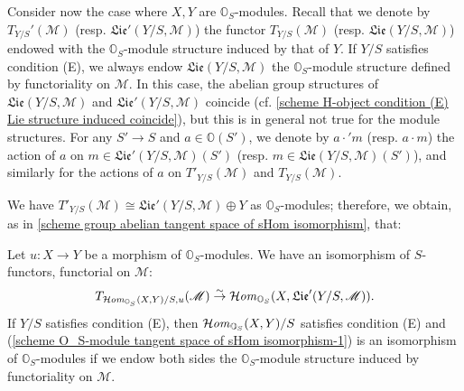 Consider now the case where $X,Y$ are $\mathbb{O}_S$-modules. Recall that we denote by $T_{Y/S}'(\mathscr{M})$ (resp. $\mathfrak{Lie}'(Y/S,\mathscr{M})$) the functor $T_{Y/S}(\mathscr{M})$ (resp. $\mathfrak{Lie}(Y/S,\mathscr{M})$) endowed with the $\mathbb{O}_S$-module structure induced by that of $Y$. If $Y/S$ satisfies condition (E), we always endow $\mathfrak{Lie}(Y/S,\mathscr{M})$ the $\mathbb{O}_S$-module structure defined by functoriality on $\mathscr{M}$. In this case, the abelian group structures of $\mathfrak{Lie}(Y/S,\mathscr{M})$ and $\mathfrak{Lie}'(Y/S,\mathscr{M})$ coincide (cf. \cref{scheme H-object condition (E) Lie structure induced coincide}), but this is in general not true for the module structures. For any $S'\to S$ and $a\in\mathbb{O}(S')$, we denote by $a\cdot'm$ (resp. $a\cdot m$) the action of $a$ on $m\in\mathfrak{Lie}'(Y/S,\mathscr{M})(S')$ (resp. $m\in\mathfrak{Lie}(Y/S,\mathscr{M})(S')$), and similarly for the actions of $a$ on $T'_{Y/S}(\mathscr{M})$ and $T_{Y/S}(\mathscr{M})$.\par
We have $T'_{Y/S}(\mathscr{M})\cong\mathfrak{Lie}'(Y/S,\mathscr{M})\oplus Y$ as $\mathbb{O}_S$-modules; therefore, we obtain, as in \cref{scheme group abelian tangent space of sHom isomorphism}, that:

\begin{proposition}\label{scheme O_S-module tangent space of sHom isomorphism}
Let $u:X\to Y$ be a morphism of $\mathbb{O}_S$-modules. We have an isomorphism of $S$-functors, functorial on $\mathscr{M}$:
\begin{equation}\label{scheme O_S-module tangent space of sHom isomorphism-1}
T_{\operatorname{\mathcal{H}\hspace*{-0.4pt}\textit{om}\hspace{0.5pt}}_{\mathbb{O}_S}(X,Y)/S,u}(\mathscr{M})\stackrel{\sim}{\to} \operatorname{\mathcal{H}\hspace*{-0.4pt}\textit{om}\hspace{0.5pt}}_{\mathbb{O}_S}(X,\mathfrak{Lie}'(Y/S,\mathscr{M})).
\end{equation}
If $Y/S$ satisfies condition (E), then $\operatorname{\mathcal{H}\hspace*{-0.4pt}\textit{om}\hspace{0.5pt}}_{\mathbb{O}_S}(X,Y)/S$ satisfies condition (E) and (\ref{scheme O_S-module tangent space of sHom isomorphism-1}) is an isomorphism of $\mathbb{O}_S$-modules if we endow both sides the $\mathbb{O}_S$-module structure induced by functoriality on $\mathscr{M}$.
\end{proposition}

